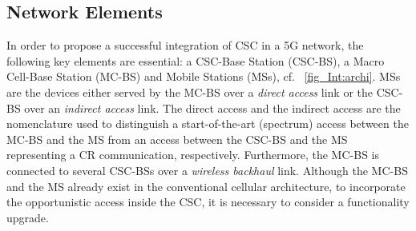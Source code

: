 \subsection{Network Elements }
 In order to propose a successful integration of CSC in a 5G network, the following key elements are essential: a CSC-Base Station (CSC-BS), a Macro Cell-Base Station (MC-BS) and Mobile Stations (MSs), cf. \figurename~\ref{fig_Int:archi}. MSs are the devices either served by the MC-BS over a \textit{direct access} link or the CSC-BS over an \textit{indirect access} link. The direct access and the indirect access are the nomenclature used to distinguish a start-of-the-art (spectrum) access between the MC-BS and the MS from an access between the CSC-BS and the MS representing a CR communication, respectively. Furthermore, the MC-BS is connected to several CSC-BSs over a \textit{wireless backhaul} link. Although the MC-BS and the MS already exist in the conventional cellular architecture, to incorporate the opportunistic access inside the CSC, it is necessary to consider a functionality upgrade.

